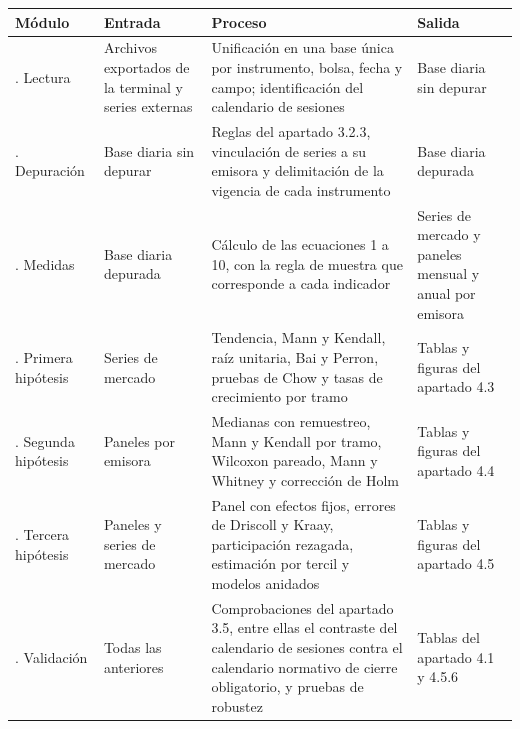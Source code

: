 
{\small
\begin{longtable}[]{@{}
  >{\raggedright\arraybackslash}p{}
  >{\raggedright\arraybackslash}p{}
  >{\raggedright\arraybackslash}p{}
  >{\raggedright\arraybackslash}p{}@{}}
\toprule\noalign{}
\begin{minipage}[b]{\linewidth}\raggedright
\textbf{Módulo}
\end{minipage} & \begin{minipage}[b]{\linewidth}\raggedright
\textbf{Entrada}
\end{minipage} & \begin{minipage}[b]{\linewidth}\raggedright
\textbf{Proceso}
\end{minipage} & \begin{minipage}[b]{\linewidth}\raggedright
\textbf{Salida}
\end{minipage} \\
\midrule\noalign{}
\endhead
\bottomrule\noalign{}
\endlastfoot
1. Lectura & Archivos exportados de la terminal y series externas & Unificación en una base única por instrumento, bolsa, fecha y campo; identificación del calendario de sesiones & Base diaria sin depurar \\
2. Depuración & Base diaria sin depurar & Reglas del apartado 3.2.3, vinculación de series a su emisora y delimitación de la vigencia de cada instrumento & Base diaria depurada \\
3. Medidas & Base diaria depurada & Cálculo de las ecuaciones 1 a 10, con la regla de muestra que corresponde a cada indicador & Series de mercado y paneles mensual y anual por emisora \\
4. Primera hipótesis & Series de mercado & Tendencia, Mann y Kendall, raíz unitaria, Bai y Perron, pruebas de Chow y tasas de crecimiento por tramo & Tablas y figuras del apartado 4.3 \\
5. Segunda hipótesis & Paneles por emisora & Medianas con remuestreo, Mann y Kendall por tramo, Wilcoxon pareado, Mann y Whitney y corrección de Holm & Tablas y figuras del apartado 4.4 \\
6. Tercera hipótesis & Paneles y series de mercado & Panel con efectos fijos, errores de Driscoll y Kraay, participación rezagada, estimación por tercil y modelos anidados & Tablas y figuras del apartado 4.5 \\
7. Validación & Todas las anteriores & Comprobaciones del apartado 3.5, entre ellas el contraste del calendario de sesiones contra el calendario normativo de cierre obligatorio, y pruebas de robustez & Tablas del apartado 4.1 y 4.5.6 \\
\end{longtable}
}

